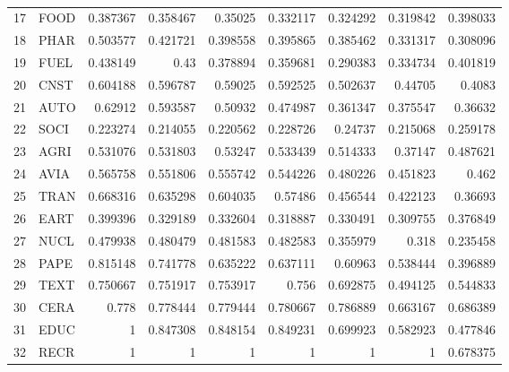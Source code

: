 \documentclass[12pt,letterpaper]{article}
\begin{document}
\begin{table}[H]
{\begin{tabular}{rlrrrrrrr}
17 & FOOD & 0.387367 & 0.358467 & 0.35025  & 0.332117 & 0.324292 & 0.319842 & 0.398033 \\
18 & PHAR & 0.503577 & 0.421721 & 0.398558 & 0.395865 & 0.385462 & 0.331317 & 0.308096 \\
19 & FUEL & 0.438149 & 0.43     & 0.378894 & 0.359681 & 0.290383 & 0.334734 & 0.401819 \\
20 & CNST & 0.604188 & 0.596787 & 0.59025  & 0.592525 & 0.502637 & 0.44705  & 0.4083   \\
21 & AUTO & 0.62912  & 0.593587 & 0.50932  & 0.474987 & 0.361347 & 0.375547 & 0.36632  \\
22 & SOCI & 0.223274 & 0.214055 & 0.220562 & 0.228726 & 0.24737  & 0.215068 & 0.259178 \\
23 & AGRI & 0.531076 & 0.531803 & 0.53247  & 0.533439 & 0.514333 & 0.37147  & 0.487621 \\
24 & AVIA & 0.565758 & 0.551806 & 0.555742 & 0.544226 & 0.480226 & 0.451823 & 0.462    \\
25 & TRAN & 0.668316 & 0.635298 & 0.604035 & 0.57486  & 0.456544 & 0.422123 & 0.36693  \\
26 & EART & 0.399396 & 0.329189 & 0.332604 & 0.318887 & 0.330491 & 0.309755 & 0.376849 \\
27 & NUCL & 0.479938 & 0.480479 & 0.481583 & 0.482583 & 0.355979 & 0.318    & 0.235458 \\
28 & PAPE & 0.815148 & 0.741778 & 0.635222 & 0.637111 & 0.60963  & 0.538444 & 0.396889 \\
29 & TEXT & 0.750667 & 0.751917 & 0.753917 & 0.756    & 0.692875 & 0.494125 & 0.544833 \\
30 & CERA & 0.778    & 0.778444 & 0.779444 & 0.780667 & 0.786889 & 0.663167 & 0.686389 \\
31 & EDUC & 1        & 0.847308 & 0.848154 & 0.849231 & 0.699923 & 0.582923 & 0.477846 \\
32 & RECR & 1        & 1        & 1        & 1        & 1        & 1        & 0.678375 \\ \hline
\end{tabular}
}
\caption{}
\label{tab:my-table}
\end{table}
\end{document}
